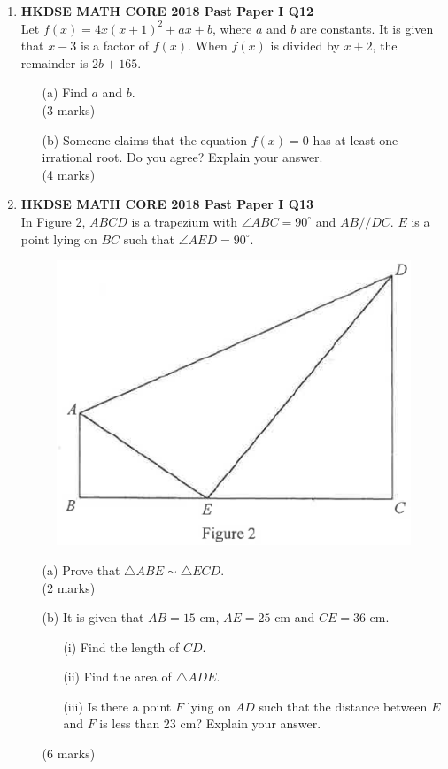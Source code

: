 \documentclass[12pt]{article}
\begin{document}
\begin{enumerate}
	\item \textbf{HKDSE MATH CORE 2018 Past Paper I Q12}\\
	Let $f(x) = 4x(x+1)^2 + ax + b$, where $a$ and $b$ are constants. It is given that $x - 3$ is a factor of $f(x)$. When $f(x)$ is divided by $x + 2$, the remainder is $2b + 165$.
	\begin{enumerate}
		\item[(a)] Find $a$ and $b$. \\(3 marks)
		\item[(b)] Someone claims that the equation $f(x) = 0$ has at least one irrational root. Do you agree? Explain your answer. \\(4 marks)
	\end{enumerate}

	\item \textbf{HKDSE MATH CORE 2018 Past Paper I Q13}\\
	In Figure 2, $ABCD$ is a trapezium with $\angle ABC = 90^\circ$ and $AB // DC$. $E$ is a point lying on $BC$ such that $\angle AED = 90^\circ$.
	\begin{figure}[H]
		\centering
		\includegraphics[width = .3\linewidth]{2018Figure1.2}
	\end{figure}
	\begin{enumerate}
		\item[(a)] Prove that $\triangle ABE \sim \triangle ECD$. \\(2 marks)
		\item[(b)] It is given that $AB = 15$ cm, $AE = 25$ cm and $CE = 36$ cm.
		\begin{enumerate}
			\item[(i)] Find the length of $CD$.
			\item[(ii)] Find the area of $\triangle ADE$.
			\item[(iii)] Is there a point $F$ lying on $AD$ such that the distance between $E$ and $F$ is less than 23 cm? Explain your answer.
		\end{enumerate}
		(6 marks)
	\end{enumerate}


\end{enumerate}
\end{document}
